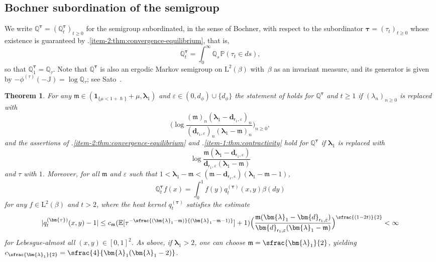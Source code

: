 \documentclass[10pt]{amsart}
\let\epsilon\varepsilon
\newcommand{\psfrac}[2]{\sfrac{(#1)}{#2}}
\newcommand{\pspfrac}[2]{\sfrac{(#1)}{(#2)}}
\theoremstyle{plain}
\newtheorem{theorem}{Theorem}[section]
\theoremstyle{definition}
\newcommand{\E}{\mathbb{E}}
\newcommand{\Prob}{\mathbb{P}}
\newcommand{\J}{\mathds{Q}}
\newcommand{\calJ}{\mathds{J}}
\newcommand{\Leb}{\mathrm{L}}
\newcommand{\m}{\mathfrak{m}}
\newcommand{\dpt}{\bm{d}_{\vat,\epsilon}}
\newcommand{\lam}{{\bm{\lambda}_1}}
\newcommand{\vat}{{\mathsf{r}_1}}
\let\h\hslash
\let\mo\mu
\let\bpsi\beta
\begin{document}
\subsection{Bochner subordination of the semigroup}

We write $\J^{\bm{\tau}} = (\J_t^{\bm{\tau}})_{t \geq 0}$ for the semigroup subordinated, in the sense of Bochner, with respect to the subordinator ${\bm{\tau}} = (\tau_t)_{t \geq 0}$ whose existence is guaranteed by .\eqref{item-2:thm:convergence-equilibrium}, that is,
\begin{equation*}
\J_t^{\bm{\tau}} = \int_0^\infty \J_s \hspace{1pt} \Prob(\tau_t \in ds),
\end{equation*}
so that $\J_1^{\bm{\tau}} = \J_\tau$. Note that $ \J^{\bm{\tau}}$ is also an ergodic Markov semigroup on $\Leb^2(\bpsi)$ with~$\bpsi$ as an invariant measure, and its generator is given by $-\phi^{(\tau)}(-\calJ) = \log \J_\tau$; see Sato~\cite[Chap.\,6]{Sato1999}.

\begin{theorem}
\label{cor:subordinated}
For any $\m \in (\bm{1}_{\{\mo < 1+\h\}} + \mo , \lam)$ and $\epsilon \in (0,d_\phi) \cup \{d_\phi\}$ the statement of  holds for $\J^{\bm{\tau}}$ and $t \ge 1$
if $(\lambda_n)_{n \geq 0}$ is replaced with
\[
\biggl(\log \frac{(\m)_n(\lam-\dpt)_n}{(\dpt)_n(\lam-\m)_n}\biggr)_{n \geq 0},
\]
and the assertions of .\eqref{item-2:thm:convergence-equilibrium} and .\eqref{item-1:thm:contractivity} hold for $\J^{\bm{\tau}}$ if $\lam$ is replaced with
\[
\log \frac{\m(\lam-\dpt)}{\dpt(\lam-\m)}
\]
and $\tau$ with $1$. Moreover, for all $\m$ and $\epsilon$ such that $1 < \lam - \m < (\m - \dpt)(\lam-\m-1)$,
\[
\J_t^{\bm{\tau}} f (x) = \int_0^1 f(y) q_t^{(\bm{\tau})}(x,y) \bpsi(dy)
\]
for any $f\in \Leb^2(\bpsi)$ and $t > 2$, where the heat kernel $q_t^{(\bm{\tau})}$ satisfies the estimate
\begin{equation*}
|q_t^{(\bm{\tau})}(x,y) - 1| \leq c_\m(\E[\tau^{-\pspfrac{\lam-\m}{\lam-\m-1}}]+1) \Bigl(\frac{\m(\lam-\dpt)}{\dpt(\lam-\m)}\Bigr)^{\psfrac{1-2t}{2}} < \infty
\end{equation*}
for Lebesgue-almost all $(x,y) \in [0,1]^2$. As above, if $\lam> 2$, one can choose $\m=\sfrac{\lam}{2}$, yielding $c_{\sfrac{\lam}{2}}=\sfrac{4}{\lam(\lam- 2)}$.
\end{theorem}
\end{document}
